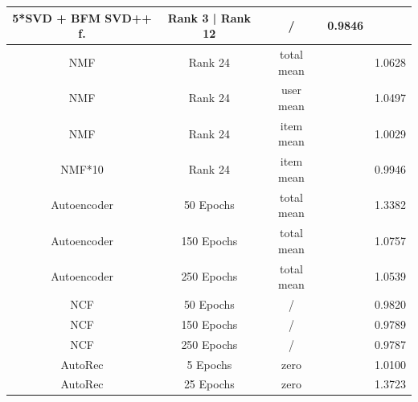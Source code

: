 \documentclass[10pt,conference,compsocconf]{IEEEtran}
\begin{document}
\begin{table}
{\begin{tabular}{|| c | c | c | c | c ||}
                5*SVD + BFM SVD++ f. & Rank 3 | Rank 12                      & /                       & 0.9846                 &                         \\
                \hline
                NMF                  & Rank 24                               & total mean              &                        & 1.0628                  \\
                NMF                  & Rank 24                               & user mean               &                        & 1.0497                  \\
                NMF                  & Rank 24                               & item mean               &                        & 1.0029                  \\
                NMF*10               & Rank 24                               & item mean               &                        & 0.9946                  \\
                \hline
                Autoencoder          & 50 Epochs                             & total mean              &                        & 1.3382                  \\
                Autoencoder          & 150 Epochs                            & total mean              &                        & 1.0757                  \\
                Autoencoder          & 250 Epochs                            & total mean              &                        & 1.0539                  \\
                \hline
                NCF                  & 50 Epochs                             & /                       &                        & 0.9820                  \\
                NCF                  & 150 Epochs                            & /                       &                        & 0.9789                  \\
                NCF                  & 250 Epochs                            & /                       &                        & 0.9787                  \\
                \hline
                AutoRec              & 5 Epochs                              & zero                    &                        & 1.0100                  \\
                AutoRec              & 25 Epochs                             & zero                    &                        & 1.3723                  \\

\end{tabular}}
\end{table}
\end{document}
